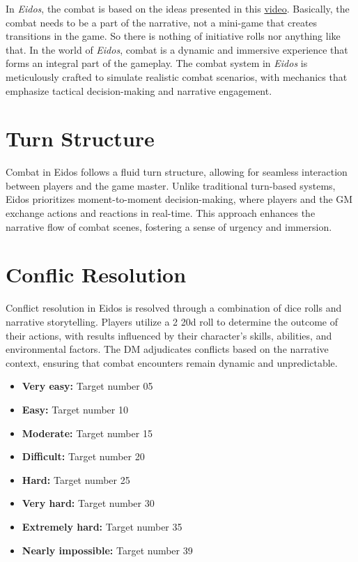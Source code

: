 \documentclass[12pt]{book}  %
\begin{document}
In \textit{Eidos}, the combat is based on the ideas presented in this \href{https://www.youtube.com/watch?v=0o5vWmoS3KU&ab_channel=SimplyWyvern}{video}. Basically, the combat needs to be a part of the narrative, not a mini-game that creates transitions in the game. So there is nothing of initiative rolls nor anything like that. In the world of \textit{Eidos}, combat is a dynamic and immersive experience that forms an integral part of the gameplay. The combat system in \textit{Eidos} is meticulously crafted to simulate realistic combat scenarios, with mechanics that emphasize tactical decision-making and narrative engagement.

\section{Turn Structure}

Combat in Eidos follows a fluid turn structure, allowing for seamless interaction between players and the game master. Unlike traditional turn-based systems, Eidos prioritizes moment-to-moment decision-making, where players and the GM exchange actions and reactions in real-time. This approach enhances the narrative flow of combat scenes, fostering a sense of urgency and immersion.

\section{Conflic Resolution}

Conflict resolution in Eidos is resolved through a combination of dice rolls and narrative storytelling. Players utilize a 2 20d roll to determine the outcome of their actions, with results influenced by their character's skills, abilities, and environmental factors. The DM adjudicates conflicts based on the narrative context, ensuring that combat encounters remain dynamic and unpredictable. 

\begin{itemize}
    \item \textbf{Very easy:} Target number 05
    \item \textbf{Easy:} Target number 10
    \item \textbf{Moderate:} Target number 15
    \item \textbf{Difficult:} Target number 20
    \item \textbf{Hard:} Target number 25
    \item \textbf{Very hard:} Target number 30
    \item \textbf{Extremely hard:} Target number 35
    \item \textbf{Nearly impossible:} Target number 39
\end{itemize}
\end{document}
